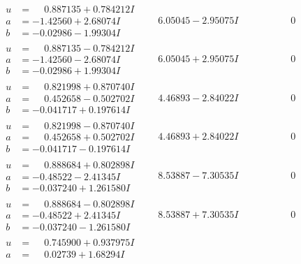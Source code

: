 \documentclass[1p]{elsarticle_modified}
\theoremstyle{definition}
\begin{document}
$$\begin{array}{c|c|c}
 \hline 
\begin{aligned}
u &= \phantom{-}0.887135 + 0.784212 I \\
a &= -1.42560 + 2.68074 I \\
b &= -0.02986 - 1.99304 I\end{aligned}
 & \phantom{-}6.05045 - 2.95075 I & \phantom{-0.000000 } 0 \\ \hline\begin{aligned}
u &= \phantom{-}0.887135 - 0.784212 I \\
a &= -1.42560 - 2.68074 I \\
b &= -0.02986 + 1.99304 I\end{aligned}
 & \phantom{-}6.05045 + 2.95075 I & \phantom{-0.000000 } 0 \\ \hline\begin{aligned}
u &= \phantom{-}0.821998 + 0.870740 I \\
a &= \phantom{-}0.452658 - 0.502702 I \\
b &= -0.041717 + 0.197614 I\end{aligned}
 & \phantom{-}4.46893 - 2.84022 I & \phantom{-0.000000 } 0 \\ \hline\begin{aligned}
u &= \phantom{-}0.821998 - 0.870740 I \\
a &= \phantom{-}0.452658 + 0.502702 I \\
b &= -0.041717 - 0.197614 I\end{aligned}
 & \phantom{-}4.46893 + 2.84022 I & \phantom{-0.000000 } 0 \\ \hline\begin{aligned}
u &= \phantom{-}0.888684 + 0.802898 I \\
a &= -0.48522 - 2.41345 I \\
b &= -0.037240 + 1.261580 I\end{aligned}
 & \phantom{-}8.53887 - 7.30535 I & \phantom{-0.000000 } 0 \\ \hline\begin{aligned}
u &= \phantom{-}0.888684 - 0.802898 I \\
a &= -0.48522 + 2.41345 I \\
b &= -0.037240 - 1.261580 I\end{aligned}
 & \phantom{-}8.53887 + 7.30535 I & \phantom{-0.000000 } 0 \\ \hline\begin{aligned}
u &= \phantom{-}0.745900 + 0.937975 I \\
a &= \phantom{-}0.02739 + 1.68294 I \\

\end{aligned}
\end{array}$$
\end{document}
